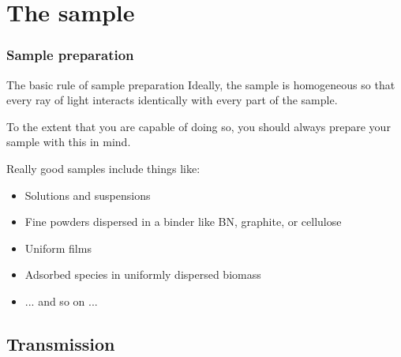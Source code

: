 \documentclass[10pt, xcolor=x11names, compress]{beamer}
\begin{document}
\section{The sample}
\label{sec:sample}

\begin{frame}
  \frametitle{Sample preparation}
  
  \begin{exampleblock}{The basic rule of sample preparation}
    Ideally, the sample is homogeneous so that every ray of light
    interacts identically with every part of the sample.
  \end{exampleblock}

  To the extent that you are capable of doing so, you should always
  prepare your sample with this in mind.

  \bigskip

  Really good samples include things like:
  \begin{itemize}
  \item Solutions and suspensions
  \item Fine powders dispersed in a binder like BN, graphite, or
    cellulose
  \item Uniform films
  \item Adsorbed species in uniformly dispersed biomass
  \item \quad... and so on ...
  \end{itemize}
\end{frame}

\subsection{Transmission}
\end{document}

